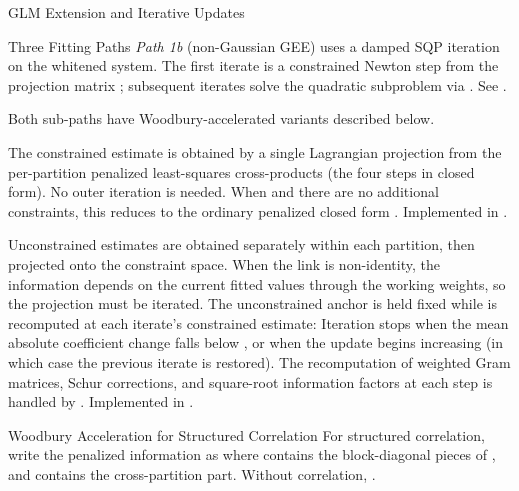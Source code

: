 \begin{Section}{GLM Extension and Iterative Updates}
\begin{SubSection}{Three Fitting Paths}
\emph{Path 1b} (non-Gaussian GEE) uses a damped SQP iteration on the
whitened system. The first iterate is a constrained Newton step from the
projection matrix ; subsequent iterates solve the
quadratic subproblem via .
See .

Both sub-paths have Woodbury-accelerated variants described below.

The constrained estimate is obtained by a single Lagrangian projection
from the per-partition penalized least-squares cross-products (the four
steps in closed form). No outer iteration is needed. When  and
there are no additional constraints, this reduces to the ordinary
penalized closed form
.
Implemented in .

Unconstrained estimates are obtained separately within each partition,
then projected onto the constraint space. When the link is non-identity,
the information  depends on the current fitted values
through the working weights, so the projection must be iterated. The
unconstrained anchor \eqn{\hat{\boldsymbol{\beta}}}{} is held fixed while
 is recomputed at each iterate's constrained estimate:
Iteration stops when the mean absolute coefficient change falls below
, or when the update begins increasing (in which case the
previous iterate is restored). The recomputation of weighted Gram
matrices, Schur corrections, and square-root information factors at each
step is handled by . Implemented
in .
\end{SubSection}


%
\begin{SubSection}{Woodbury Acceleration for Structured Correlation}
For structured correlation, write the penalized information as
where  contains the 
block-diagonal  pieces of
,
and  contains the cross-partition part.
Without correlation, .


\end{SubSection}
\end{Section}
